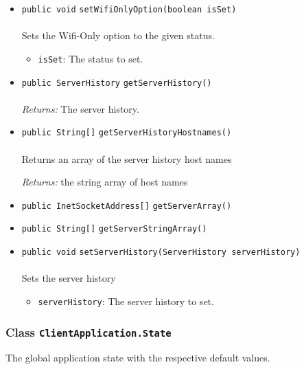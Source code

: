 \begin{itemize}
\item \lstinline|public void| \lstinline|setWifiOnlyOption|\lstinline|(boolean isSet)|\\ \\[-0.6em]
Sets the Wifi-Only option to the given status.
\begin{itemize}
\item \lstinline|isSet|: The status to set.
\end{itemize}



\item \lstinline|public ServerHistory| \lstinline|getServerHistory|\lstinline|()|\\ \\[-0.6em]
\emph{Returns:} The server history.



\item \lstinline|public String[]| \lstinline|getServerHistoryHostnames|\lstinline|()|\\ \\[-0.6em]
Returns an array of the server history host names

\emph{Returns:} the string array of host names

\item \lstinline|public InetSocketAddress[]| \lstinline|getServerArray|\lstinline|()| \\[-0.6em]




\item \lstinline|public String[]| \lstinline|getServerStringArray|\lstinline|()| \\[-0.6em]




\item \lstinline|public void| \lstinline|setServerHistory|\lstinline|(ServerHistory serverHistory)|\\ \\[-0.6em]
Sets the server history
\begin{itemize}
\item \lstinline|serverHistory|: The server history to set.
\end{itemize}



\end{itemize}

\subsubsection{Class \lstinline|ClientApplication.State|}
The global application state with the respective default values. \\
\noindent\begin{minipage}[t]{5cm}
\vspace{0.3em}
\hspace*{2em}
\vspace{0.3em}
\end{minipage}



